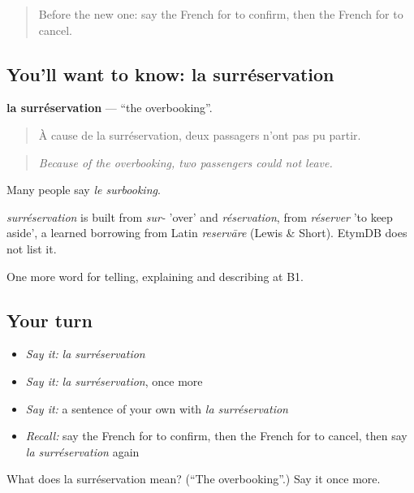 \label{lesson:FR-C421-surreservation}



\begin{quote}
Before the new one: say the French for to confirm, then the French for to cancel.
\end{quote}

\subsection*{You'll want to know: la surréservation}
\textbf{la surréservation} — \textquotedblleft{}the overbooking\textquotedblright{}.

\begin{quote}
À cause de la surréservation, deux passagers n'ont pas pu partir.
\end{quote}

\begin{quote}
\emph{Because of the overbooking, two passengers could not leave.}
\end{quote}

Many people say \emph{le surbooking}.

\begin{cousinweb}
\emph{surréservation} is built from \emph{sur-} 'over' and \emph{réservation}, from \emph{réserver} 'to keep aside', a learned borrowing from Latin \emph{reservāre} (Lewis \& Short). EtymDB does not list it.
\end{cousinweb}

\begin{grammarlens}[title={What you've built}]
One more word for telling, explaining and describing at B1.
\end{grammarlens}

\subsection*{Your turn}
\begin{itemize}
\raggedright
  \item \emph{Say it:} \emph{la surréservation}
  \item \emph{Say it:} \emph{la surréservation}, once more
  \item \emph{Say it:} a sentence of your own with \emph{la surréservation}
  \item \emph{Recall:} say the French for to confirm, then the French for to cancel, then say \emph{la surréservation} again
\end{itemize}

\begin{tcolorbox}[breakable,colback=teal!4,colframe=teal!35!black,title={Before you move on}]
What does la surréservation mean? (\textquotedblleft{}The overbooking\textquotedblright{}.) Say it once more.
\end{tcolorbox}
